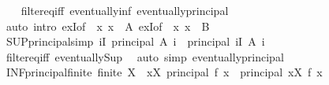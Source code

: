\begin{isabellebody}
%
\isadelimproof
\ \ %
\endisadelimproof
%
\isatagproof
{}\isamarkupfalse%
\ filter{\isacharunderscore}{\kern0pt}eq{\isacharunderscore}{\kern0pt}iff\ eventually{\isacharunderscore}{\kern0pt}inf\ eventually{\isacharunderscore}{\kern0pt}principal\isanewline
\ \ \isamarkupfalse%
\ {\isacharparenleft}{\kern0pt}auto\ intro{\isacharcolon}{\kern0pt}\ exI{\isacharbrackleft}{\kern0pt}of\ {\isacharunderscore}{\kern0pt}\ {\isachardoublequoteopen}{\isasymlambda}x{\isachardot}{\kern0pt}\ x\ {\isasymin}\ A{\isachardoublequoteclose}{\isacharbrackright}{\kern0pt}\ exI{\isacharbrackleft}{\kern0pt}of\ {\isacharunderscore}{\kern0pt}\ {\isachardoublequoteopen}{\isasymlambda}x{\isachardot}{\kern0pt}\ x\ {\isasymin}\ B{\isachardoublequoteclose}{\isacharbrackright}{\kern0pt}{\isacharparenright}{\kern0pt}%
\endisatagproof
{\isafoldproof}%
%
\isadelimproof
\isanewline
%
\endisadelimproof
\isanewline
{}\isamarkupfalse%
\ SUP{\isacharunderscore}{\kern0pt}principal{\isacharbrackleft}{\kern0pt}simp{\isacharbrackright}{\kern0pt}{\isacharcolon}{\kern0pt}\ {\isachardoublequoteopen}{\isacharparenleft}{\kern0pt}{\isasymSqunion}i{\isasymin}I{\isachardot}{\kern0pt}\ principal\ {\isacharparenleft}{\kern0pt}A\ i{\isacharparenright}{\kern0pt}{\isacharparenright}{\kern0pt}\ {\isacharequal}{\kern0pt}\ principal\ {\isacharparenleft}{\kern0pt}{\isasymUnion}i{\isasymin}I{\isachardot}{\kern0pt}\ A\ i{\isacharparenright}{\kern0pt}{\isachardoublequoteclose}\isanewline
%
\isadelimproof
\ \ %
\endisadelimproof
%
\isatagproof
{}\isamarkupfalse%
\ filter{\isacharunderscore}{\kern0pt}eq{\isacharunderscore}{\kern0pt}iff\ eventually{\isacharunderscore}{\kern0pt}Sup\ \isamarkupfalse%
\ {\isacharparenleft}{\kern0pt}auto\ simp{\isacharcolon}{\kern0pt}\ eventually{\isacharunderscore}{\kern0pt}principal{\isacharparenright}{\kern0pt}%
\endisatagproof
{\isafoldproof}%
%
\isadelimproof
\isanewline
%
\endisadelimproof
\isanewline
{}\isamarkupfalse%
\ INF{\isacharunderscore}{\kern0pt}principal{\isacharunderscore}{\kern0pt}finite{\isacharcolon}{\kern0pt}\ {\isachardoublequoteopen}finite\ X\ {\isasymLongrightarrow}\ {\isacharparenleft}{\kern0pt}{\isasymSqinter}x{\isasymin}X{\isachardot}{\kern0pt}\ principal\ {\isacharparenleft}{\kern0pt}f\ x{\isacharparenright}{\kern0pt}{\isacharparenright}{\kern0pt}\ {\isacharequal}{\kern0pt}\ principal\ {\isacharparenleft}{\kern0pt}{\isasymInter}x{\isasymin}X{\isachardot}{\kern0pt}\ f\ x{\isacharparenright}{\kern0pt}{\isachardoublequoteclose}\isanewline
%
\isadelimproof
\ \ %
\endisadelimproof

\end{isabellebody}
